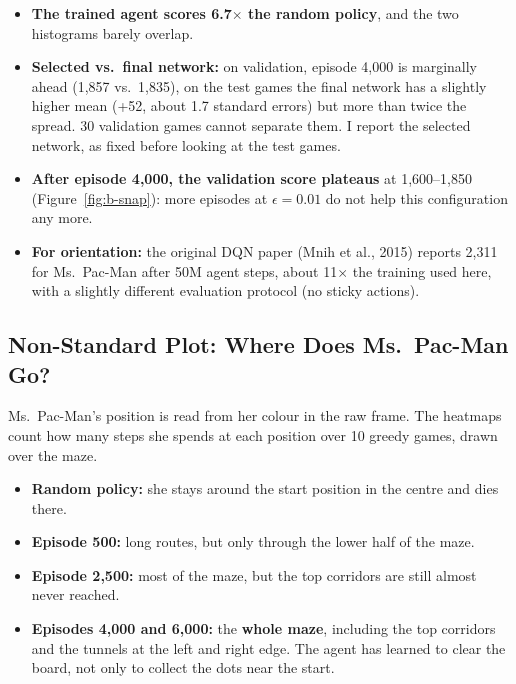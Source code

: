\begin{itemize}
  \item \textbf{The trained agent scores 6.7$\times$ the random policy}, and the two histograms barely overlap.
  \item \textbf{Selected vs.\ final network:} on validation, episode 4,000 is marginally ahead (1,857 vs.\ 1,835), on the test games the final network has a slightly higher mean (+52, about 1.7 standard errors) but more than twice the spread. 30 validation games cannot separate them. I report the selected network, as fixed before looking at the test games.
  \item \textbf{After episode 4,000, the validation score plateaus} at 1,600--1,850 (Figure~\ref{fig:b-snap}): more episodes at $\epsilon = 0.01$ do not help this configuration any more.
  \item \textbf{For orientation:} the original DQN paper (Mnih et al., 2015) reports 2,311 for Ms.\ Pac-Man after 50M agent steps, about 11$\times$ the training used here, with a slightly different evaluation protocol (no sticky actions).
\end{itemize}

\subsection{Non-Standard Plot: Where Does Ms.\ Pac-Man Go?}

Ms.\ Pac-Man's position is read from her colour in the raw frame. The heatmaps count how many steps she spends at each position over 10 greedy games, drawn over the maze.


\begin{itemize}
  \item \textbf{Random policy:} she stays around the start position in the centre and dies there.
  \item \textbf{Episode 500:} long routes, but only through the lower half of the maze.
  \item \textbf{Episode 2,500:} most of the maze, but the top corridors are still almost never reached.
  \item \textbf{Episodes 4,000 and 6,000:} the \textbf{whole maze}, including the top corridors and the tunnels at the left and right edge. The agent has learned to clear the board, not only to collect the dots near the start.
\end{itemize}

